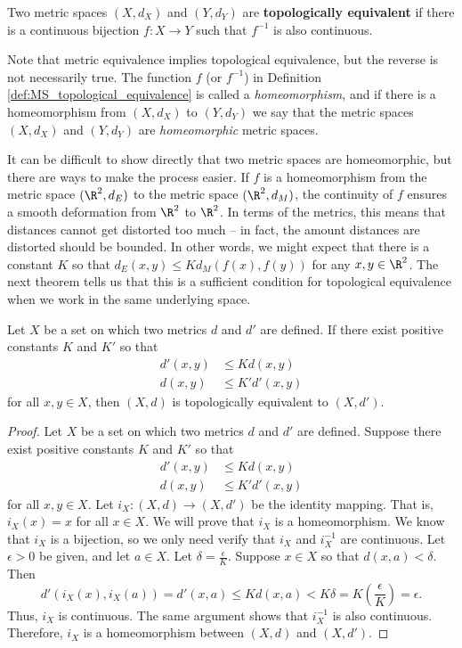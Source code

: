 \begin{definition} \label{def:MS_topological_equivalence} Two metric spaces $(X,d_X)$ and $(Y,d_Y)$ are \textbf{topologically equivalent} if there is a continuous bijection $f : X \to Y$ such that $f^{-1}$ is also continuous.  
\end{definition}



Note that metric equivalence implies topological equivalence, but the reverse is not necessarily true. The function $f$ (or $f^{-1}$) in Definition \ref{def:MS_topological_equivalence} is called a \emph{homeomorphism}, and if there is a homeomorphism from $(X,d_X)$ to $(Y,d_Y)$ we say that the metric spaces $(X,d_X)$ and $(Y,d_Y)$ are \emph{homeomorphic} metric spaces. 

It can be difficult to show directly that two metric spaces are homeomorphic, but there are ways to make the process easier. If $f$ is a homeomorphism from the metric space $(\R^2, d_E)$ to the metric space $(\R^2, d_M)$, the continuity of $f$ ensures a smooth deformation from $\R^2$ to $\R^2$. In terms of the metrics, this means that distances cannot get distorted too much -- in fact, the amount distances are distorted should be bounded. In other words, we might expect that there is a constant $K$ so that $d_E(x,y) \leq K d_M(f(x), f(y))$ for any $x, y \in \R^2$. The next theorem tells us that this is a sufficient condition for topological equivalence when we work in the same underlying space. 



\begin{theorem} Let $X$ be a set on which two metrics $d$ and $d'$ are defined. If there exist positive constants $K$ and $K'$ so that 
\begin{align*}
d'(x,y) &\leq K d(x,y) \\
d(x,y) &\leq K' d'(x,y)
\end{align*}
for all $x,y \in X$, then $(X,d)$ is topologically equivalent to $(X,d')$.  
\end{theorem}

\begin{proof} Let $X$ be a set on which two metrics $d$ and $d'$ are defined. Suppose there exist positive constants $K$ and $K'$ so that 
\begin{align*}
d'(x,y) &\leq K d(x,y) \\
d(x,y) &\leq K' d'(x,y)
\end{align*}
for all $x,y \in X$. Let $i_X : (X,d) \to (X,d')$ be the identity mapping. That is, $i_X(x)=x$ for all $x \in X$. We will prove that $i_X$ is a homeomorphism. We know that $i_X$ is a bijection, so we only need verify that $i_X$ and $i_X^{-1}$ are continuous. Let $\epsilon > 0$ be given, and let $a \in X$. Let $\delta = \frac{\epsilon}{K}$. Suppose $x \in X$ so that $d(x,a) < \delta$. Then 
\[d'(i_X(x), i_X(a)) = d'(x,a) \leq Kd(x,a) < K\delta = K\left(\frac{\epsilon}{K}\right) = \epsilon.\]
Thus, $i_X$ is continuous. The same argument shows that $i_X^{-1}$ is also continuous. Therefore, $i_X$ is a homeomorphism between $(X,d)$ and $(X,d')$. 
\end{proof}




